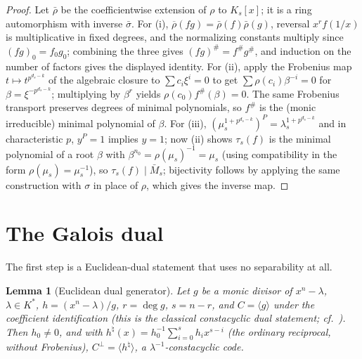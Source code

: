\documentclass[11pt]{article}
\newtheorem{lemma}[theorem]{Lemma}
\theoremstyle{definition}
\theoremstyle{remark}
\begin{document}
\begin{proof}
Let \(\bar\rho\) be the coefficientwise extension of \(\rho\) to
\(K_s[x]\); it is a ring automorphism with inverse \(\bar\sigma\).
For (i), \(\overline\rho(fg) = \bar\rho(f)\bar\rho(g)\), reversal
\(x^{r}f(1/x)\) is multiplicative in fixed degrees, and the normalizing
constants multiply since \((fg)_0 = f_0 g_0\); combining the three gives
\((fg)^{\#} = f^{\#} g^{\#}\), and induction on the number of factors
gives the displayed identity. For (ii), apply the Frobenius map
\(t \mapsto t^{p^{d_s-k}}\) of the algebraic closure to
\(\sum c_i \xi^i = 0\) to get \(\sum \rho(c_i) \beta^{-i} = 0\) for
\(\beta = \xi^{-p^{d_s-k}}\); multiplying by \(\beta^r\) yields
\(\rho(c_0) f^{\#}(\beta) = 0\). The same Frobenius transport preserves
degrees of minimal polynomials, so \(f^{\#}\) is the (monic irreducible)
minimal polynomial of \(\beta\). For (iii),
\((\mu_s^{1+p^{d_s-k}})^P = \lambda_s^{1+p^{d_s-k}}\) and in
characteristic \(p\), \(y^P = 1\) implies \(y = 1\); now (ii) shows
\(\tau_s(f)\) is the minimal polynomial of a root \(\beta\) with
\(\beta^{n_0} = \rho(\mu_s)^{-1} = \mu_s\) (using compatibility in the
form \(\rho(\mu_s) = \mu_s^{-1}\)), so \(\tau_s(f) \mid \bar M_s\);
bijectivity follows by applying the same construction with \(\sigma\) in
place of \(\rho\), which gives the inverse map.
\end{proof}

\section{The Galois dual}\label{sec:dual}

The first step is a Euclidean-dual statement that uses no separability
at all.

\begin{lemma}[Euclidean dual generator]\label{lem:RR3}
Let \(g\) be a monic divisor of \(x^n - \lambda\), \(\lambda \in K^*\),
\(h = (x^n-\lambda)/g\), \(r = \deg g\), \(s = n - r\), and
\(C = \langle g \rangle\) under the coefficient identification (this is
the classical constacyclic dual statement;
cf.~\cite{HP2003, MS1977}). Then
\(h_0 \ne 0\), and with
\(h^{\natural}(x) = h_0^{-1} \sum_{i=0}^{s} h_i x^{s-i}\) (the ordinary
reciprocal, without Frobenius),
\(C^\perp = \langle h^{\natural} \rangle\), a \(\lambda^{-1}\)-constacyclic
code.
\end{lemma}
\end{document}
